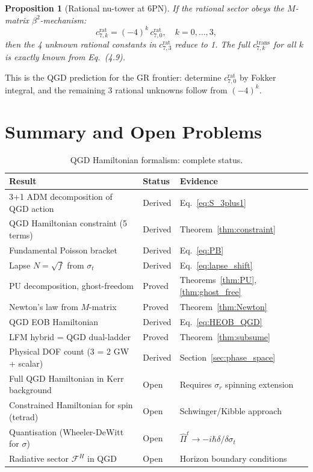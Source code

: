 \documentclass[11pt,a4paper]{article}
\theoremstyle{plain}
\newtheorem{proposition}[theorem]{Proposition}
\theoremstyle{definition}
\theoremstyle{remark}
\begin{document}
\begin{proposition}[Rational nu-tower at 6PN]\label{prop:rat_nutower}
If the rational sector obeys the $M$-matrix $\beta^2$-mechanism:
\begin{equation}
  c_{7,k}^{\mathrm{rat}} = (-4)^k\,c_{7,0}^{\mathrm{rat}}, \quad k=0,\ldots,3,
  \label{eq:rat_nutower}
\end{equation}
then the 4 unknown rational constants in $c_{7,3}^{\mathrm{rat}}$ reduce to 1.
The full $c_{7,k}^{\mathrm{trans}}$ for all $k$ is exactly known from Eq.~(4.9).
\end{proposition}

This is the QGD prediction for the GR frontier: determine $c_{7,0}^{\mathrm{rat}}$
by Fokker integral, and the remaining 3 rational unknowns follow from $(-4)^k$.

\section{Summary and Open Problems}
\label{sec:summary}

\begin{table}[h]
\centering
\renewcommand{\arraystretch}{1.35}
\caption{QGD Hamiltonian formalism: complete status.}
\label{tab:status}
\begin{tabular}{@{}p{6cm}p{3cm}p{4.5cm}@{}}
\toprule
Result & Status & Evidence \\
\midrule
3+1 ADM decomposition of QGD action & Derived & Eq.~\eqref{eq:S_3plus1} \\
QGD Hamiltonian constraint (5 terms) & Derived & Theorem~\ref{thm:constraint} \\
Fundamental Poisson bracket & Derived & Eq.~\eqref{eq:PB} \\
Lapse $N = \sqrt{f}$ from $\sigma_t$ & Derived & Eq.~\eqref{eq:lapse_shift} \\
PU decomposition, ghost-freedom & Proved & Theorems~\ref{thm:PU},\ref{thm:ghost_free} \\
Newton's law from $M$-matrix & Proved & Theorem~\ref{thm:Newton} \\
QGD EOB Hamiltonian & Derived & Eq.~\eqref{eq:HEOB_QGD} \\
LFM hybrid = QGD dual-ladder & Proved & Theorem~\ref{thm:subsume} \\
Physical DOF count (3 = 2 GW + scalar) & Derived & Section~\ref{sec:phase_space} \\
\midrule
Full QGD Hamiltonian in Kerr background & Open & Requires $\sigma_r$ spinning extension \\
Constrained Hamiltonian for spin (tetrad) & Open & Schwinger/Kibble approach \\
Quantisation (Wheeler-DeWitt for $\sigma$) & Open & $\hat\Pi^t \to -i\hbar\delta/\delta\sigma_t$ \\
Radiative sector $\mathcal{F}^H$ in QGD & Open & Horizon boundary conditions \\
\bottomrule
\end{tabular}
\end{table}
\end{document}
